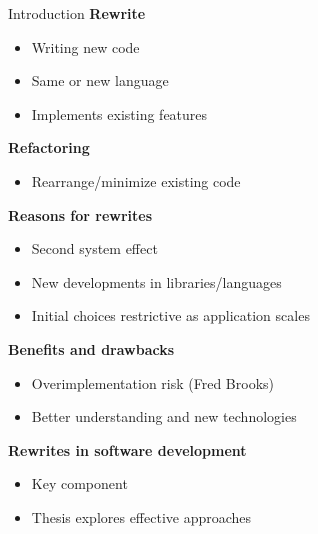 \begin{frame}{Introduction}
        \textbf{Rewrite}
        \begin{itemize}
            \item Writing new code
            \item Same or new language
            \item Implements existing features
        \end{itemize}
        \pause
        \textbf{Refactoring}
        \begin{itemize}
            \item Rearrange/minimize existing code
        \end{itemize}
        \pause
        \textbf{Reasons for rewrites}
        \begin{itemize}
            \item Second system effect
            \item New developments in libraries/languages
            \item Initial choices restrictive as application scales
        \end{itemize}
        \pause
        \textbf{Benefits and drawbacks}
        \begin{itemize}
            \item Overimplementation risk (Fred Brooks)
            \item Better understanding and new technologies
        \end{itemize}
        \pause
        \textbf{Rewrites in software development}
        \begin{itemize}
            \item Key component
            \item Thesis explores effective approaches
        \end{itemize}
\end{frame}